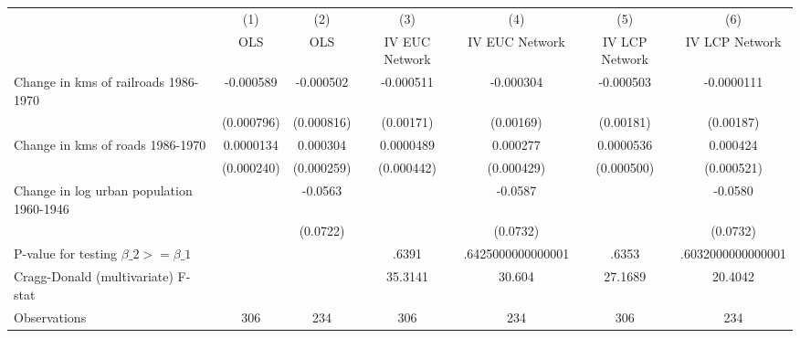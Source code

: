 {
\def\sym#1{\ifmmode^{#1}\else\(^{#1}\)\fi}
\begin{tabular}{l*{6}{c}}
\hline\hline
                &\multicolumn{1}{c}{(1)}&\multicolumn{1}{c}{(2)}&\multicolumn{1}{c}{(3)}&\multicolumn{1}{c}{(4)}&\multicolumn{1}{c}{(5)}&\multicolumn{1}{c}{(6)}\\
                &\multicolumn{1}{c}{OLS}&\multicolumn{1}{c}{OLS}&\multicolumn{1}{c}{IV EUC Network}&\multicolumn{1}{c}{IV EUC Network}&\multicolumn{1}{c}{IV LCP Network}&\multicolumn{1}{c}{IV LCP Network}\\
\hline
Change in kms of railroads 1986-1970&-0.000589         &-0.000502         &-0.000511         &-0.000304         &-0.000503         &-0.0000111         \\
                &(0.000796)         &(0.000816)         &(0.00171)         &(0.00169)         &(0.00181)         &(0.00187)         \\
[1em]
Change in kms of roads 1986-1970&0.0000134         & 0.000304         &0.0000489         & 0.000277         &0.0000536         & 0.000424         \\
                &(0.000240)         &(0.000259)         &(0.000442)         &(0.000429)         &(0.000500)         &(0.000521)         \\
[1em]
Change in log urban population 1960-1946&                  &  -0.0563         &                  &  -0.0587         &                  &  -0.0580         \\
                &                  & (0.0722)         &                  & (0.0732)         &                  & (0.0732)         \\
\hline
P-value for testing $\beta\_{2} >= \beta\_{1}$&                  &                  &    .6391         &.6425000000000001         &    .6353         &.6032000000000001         \\
Cragg-Donald (multivariate) F-stat&                  &                  &  35.3141         &   30.604         &  27.1689         &  20.4042         \\
Observations    &      306         &      234         &      306         &      234         &      306         &      234         \\
\hline\hline
\end{tabular}
}
